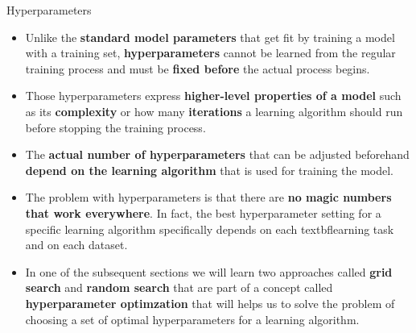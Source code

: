 \documentclass[document.tex]{subfiles}
\begin{document}
    \begin{frame}{Hyperparameters}
        \begin{itemize}
            \item Unlike the \textbf{standard model parameters} that get fit by training a model with a training set, \textbf{hyperparameters} cannot be learned from the regular training process and must be \textbf{fixed before} the actual process begins.
            \item Those hyperparameters express \textbf{higher-level properties of a model} such as its \textbf{complexity} or how many \textbf{iterations} a learning algorithm should run before stopping the training process. 
            \item The \textbf{actual number of hyperparameters} that can be adjusted beforehand \textbf{depend on the learning algorithm} that is used for training the model.
            \item The problem with hyperparameters is that there are \textbf{no magic numbers that work everywhere}. In fact, the best hyperparameter setting for a specific learning algorithm specifically depends on each textbf{learning task and on each dataset}.
            \item In one of the subsequent sections we will learn two approaches called \textbf{grid search} and \textbf{random search} that are part of a concept called \textbf{hyperparameter optimzation} that will helps us to solve the problem of choosing a set of optimal hyperparameters for a learning algorithm.
        \end{itemize}
    \end{frame}
\end{document}
